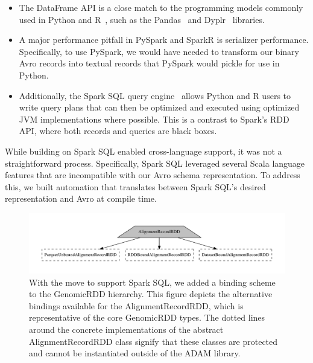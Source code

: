 \documentclass[phd]{ucbthesis}
\begin{document}
\begin{itemize}
\item The {DataFrame} API is a close match to the programming models
  commonly used in {Python} and R~\cite{armbrust15}, such as the
  {Pandas}~\cite{mckinney10} and {Dyplr}~\cite{wickham15} libraries.
\item A major performance pitfall in {PySpark} and {SparkR} is
  serializer performance. Specifically, to use {PySpark}, we would have
  needed to transform our binary {Avro} records into textual records that
  {PySpark} would pickle for use in {Python}.
\item Additionally, the {Spark SQL} query engine~\cite{armbrust15} allows
  {Python} and R users to write query plans that can then be optimized
  and executed using optimized JVM implementations where possible. This is a
  contrast to {Spark}'s RDD API, where both records and queries are black
  boxes.
\end{itemize}

While building on {Spark SQL} enabled cross-language support, it was not
a straightforward process. Specifically, {Spark SQL} leveraged several
{Scala} language features that are incompatible with our {Avro}
schema representation. To address this, we built automation that translates
between {Spark SQL}'s desired representation and {Avro} at compile
time.

\begin{figure}[h]
\begin{center}
\includegraphics[width=0.8\linewidth]{graphs/binding.pdf}
\end{center}
\caption{With the move to support {Spark SQL}, we added a binding scheme
  to the {GenomicRDD} hierarchy. This figure depicts the alternative
  bindings available for the {AlignmentRecordRDD}, which is
  representative of the core {GenomicRDD} types. The dotted lines around
  the concrete implementations of the abstract {AlignmentRecordRDD} class
  signify that these classes are protected and cannot be instantiated outside of
  the {ADAM} library.}
\label{fig:binding}
\end{figure}
\end{document}
